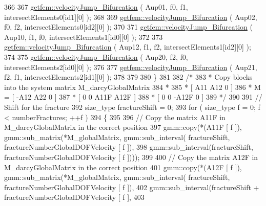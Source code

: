 \begin{DoxyCode}
366 
367         \hyperlink{namespacegetfem_a41dedc9759949101293821b324cf5ac6}{getfem::velocityJump\_Bifurcation} ( Aup01, f0, f1, 
      intersectElements0[id1][0] );
368         
369         \hyperlink{namespacegetfem_a41dedc9759949101293821b324cf5ac6}{getfem::velocityJump\_Bifurcation} ( Aup02, f0, f2, 
      intersectElements0[id2][0] );
370         
371         \hyperlink{namespacegetfem_a41dedc9759949101293821b324cf5ac6}{getfem::velocityJump\_Bifurcation} ( Aup10, f1, f0, 
      intersectElements1[id0][0] );
372         
373         \hyperlink{namespacegetfem_a41dedc9759949101293821b324cf5ac6}{getfem::velocityJump\_Bifurcation} ( Aup12, f1, f2, 
      intersectElements1[id2][0] );
374         
375         \hyperlink{namespacegetfem_a41dedc9759949101293821b324cf5ac6}{getfem::velocityJump\_Bifurcation} ( Aup20, f2, f0, 
      intersectElements2[id0][0] );
376         
377         \hyperlink{namespacegetfem_a41dedc9759949101293821b324cf5ac6}{getfem::velocityJump\_Bifurcation} ( Aup21, f2, f1, 
      intersectElements2[id1][0] );
378 
379 
380     \}
381     
382     \textcolor{comment}{/*}
383 \textcolor{comment}{     *      Copy blocks into the system matrix M\_darcyGlobalMatrix}
384 \textcolor{comment}{     *      }
385 \textcolor{comment}{     *              [  A11  A12  0          ]}
386 \textcolor{comment}{     *          M = [ -A12  A22  0          ]}
387 \textcolor{comment}{     *              [  0    0    A11F  A12F ]}
388 \textcolor{comment}{     *              [  0    0   -A12F  0    ]       }
389 \textcolor{comment}{     */} 
390  
391     \textcolor{comment}{// Shift for the fracture}
392     size\_type fractureShift = 0;
393     \textcolor{keywordflow}{for} ( size\_type f = 0; f < numberFractures; ++f )
394     \{
395 
396         \textcolor{comment}{// Copy the matrix A11F in M\_darcyGlobalMatrix in the correct position}
397         gmm::copy(*(A11F [ f ]), gmm::sub\_matrix(*M\_globalMatrix, gmm::sub\_interval( fractureShift, 
      fractureNumberGlobalDOFVelocity [ f ]),
398                                                                   gmm::sub\_interval(fractureShift, 
      fractureNumberGlobalDOFVelocity [ f ])));
399 
400         \textcolor{comment}{// Copy the matrix A12F in M\_darcyGlobalMatrix in the correct position}
401         gmm::copy(*(A12F [ f ]), gmm::sub\_matrix(*M\_globalMatrix, gmm::sub\_interval( fractureShift, 
      fractureNumberGlobalDOFVelocity [ f ]),
402                                                                   gmm::sub\_interval(fractureShift + 
      fractureNumberGlobalDOFVelocity [ f ], 
403                                                                                     

\end{DoxyCode}
